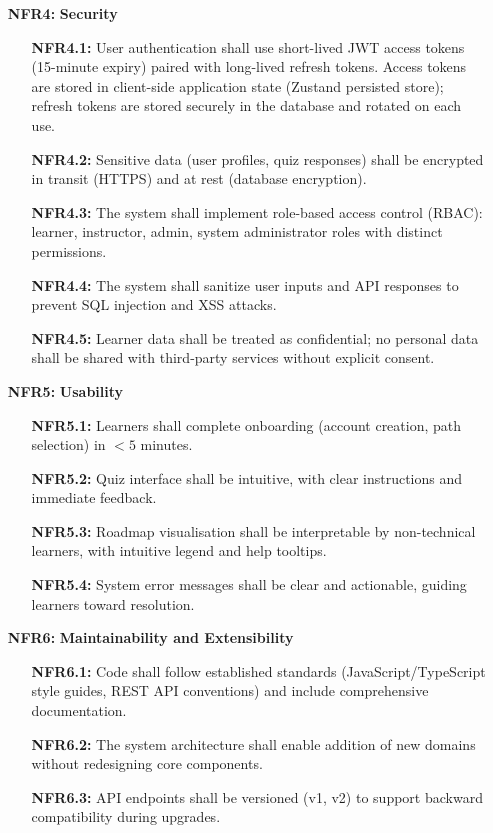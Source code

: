 \begin{enumerate}
    \item[\textbf{NFR4:}] \textbf{Security}
        \begin{enumerate}
            \item[\textbf{NFR4.1:}] User authentication shall use short-lived JWT access tokens (15-minute expiry) paired with long-lived refresh tokens. Access tokens are stored in client-side application state (Zustand persisted store); refresh tokens are stored securely in the database and rotated on each use.
            \item[\textbf{NFR4.2:}] Sensitive data (user profiles, quiz responses) shall be encrypted in transit (HTTPS) and at rest (database encryption).
            \item[\textbf{NFR4.3:}] The system shall implement role-based access control (RBAC): learner, instructor, admin, system administrator roles with distinct permissions.
            \item[\textbf{NFR4.4:}] The system shall sanitize user inputs and API responses to prevent SQL injection and XSS attacks.
            \item[\textbf{NFR4.5:}] Learner data shall be treated as confidential; no personal data shall be shared with third-party services without explicit consent.
        \end{enumerate}

    \item[\textbf{NFR5:}] \textbf{Usability}
        \begin{enumerate}
            \item[\textbf{NFR5.1:}] Learners shall complete onboarding (account creation, path selection) in \(<5\) minutes.
            \item[\textbf{NFR5.2:}] Quiz interface shall be intuitive, with clear instructions and immediate feedback.
            \item[\textbf{NFR5.3:}] Roadmap visualisation shall be interpretable by non-technical learners, with intuitive legend and help tooltips.
            \item[\textbf{NFR5.4:}] System error messages shall be clear and actionable, guiding learners toward resolution.
        \end{enumerate}

    \item[\textbf{NFR6:}] \textbf{Maintainability and Extensibility}
        \begin{enumerate}
            \item[\textbf{NFR6.1:}] Code shall follow established standards (JavaScript/TypeScript style guides, REST API conventions) and include comprehensive documentation.
            \item[\textbf{NFR6.2:}] The system architecture shall enable addition of new domains without redesigning core components.
            \item[\textbf{NFR6.3:}] API endpoints shall be versioned (v1, v2) to support backward compatibility during upgrades.
        \end{enumerate}


\end{enumerate}
